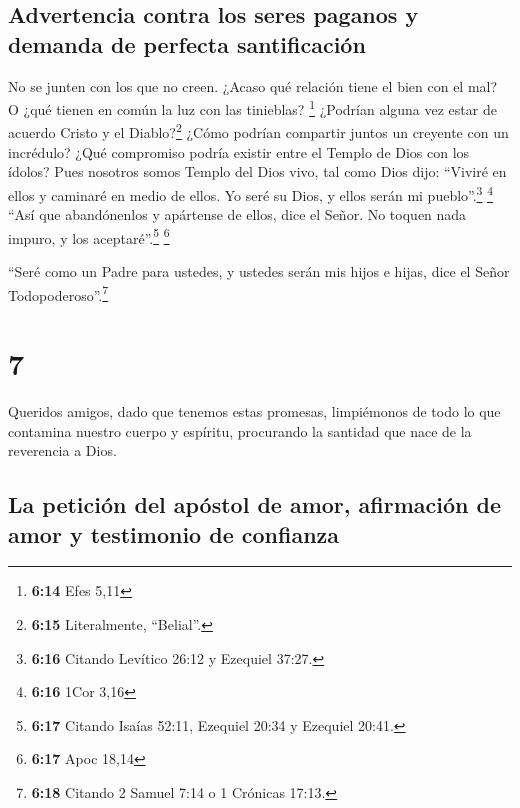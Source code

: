 \hypertarget{advertencia-contra-los-seres-paganos-y-demanda-de-perfecta-santificaciuxf3n}{%
\subsection{Advertencia contra los seres paganos y demanda de perfecta
santificación}\label{advertencia-contra-los-seres-paganos-y-demanda-de-perfecta-santificaciuxf3n}}

 No se junten con los que no creen. ¿Acaso qué relación
tiene el bien con el mal? O ¿qué tienen en común la luz con las
tinieblas? \footnote{\textbf{6:14} Efes 5,11}  ¿Podrían
alguna vez estar de acuerdo Cristo y el Diablo?\footnote{\textbf{6:15}
  Literalmente, ``Belial''.} ¿Cómo podrían compartir juntos un creyente
con un incrédulo?  ¿Qué compromiso podría existir entre
el Templo de Dios con los ídolos? Pues nosotros somos Templo del Dios
vivo, tal como Dios dijo: ``Viviré en ellos y caminaré en medio de
ellos. Yo seré su Dios, y ellos serán mi pueblo''.\footnote{\textbf{6:16}
  Citando Levítico 26:12 y Ezequiel 37:27.} \footnote{\textbf{6:16} 1Cor
  3,16}  ``Así que abandónenlos y apártense de ellos,
dice el Señor. No toquen nada impuro, y los aceptaré''.\footnote{\textbf{6:17}
  Citando Isaías 52:11, Ezequiel 20:34 y Ezequiel 20:41.} \footnote{\textbf{6:17}
  Apoc 18,14}

 ``Seré como un Padre para ustedes, y ustedes serán mis
hijos e hijas, dice el Señor Todopoderoso''.\footnote{\textbf{6:18}
  Citando 2 Samuel 7:14 o 1 Crónicas 17:13.}

\hypertarget{section-6}{%
\section{7}\label{section-6}}

 Queridos amigos, dado que tenemos estas promesas,
limpiémonos de todo lo que contamina nuestro cuerpo y espíritu,
procurando la santidad que nace de la reverencia a Dios.

\hypertarget{la-peticiuxf3n-del-apuxf3stol-de-amor-afirmaciuxf3n-de-amor-y-testimonio-de-confianza}{%
\subsection{La petición del apóstol de amor, afirmación de amor y
testimonio de
confianza}\label{la-peticiuxf3n-del-apuxf3stol-de-amor-afirmaciuxf3n-de-amor-y-testimonio-de-confianza}}

